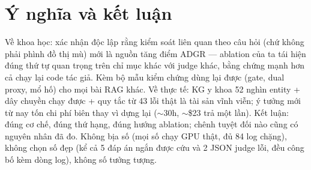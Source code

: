 \documentclass[12pt,a4paper]{article}
\begin{document}
\section{Ý nghĩa và kết luận}
Về khoa học: xác nhận độc lập rằng kiểm soát liên quan theo câu hỏi (chứ không
phải phình đồ thị mù) mới là nguồn tăng điểm ADGR --- ablation của ta tái hiện
đúng thứ tự quan trọng trên chỉ mục khác với judge khác, bằng chứng mạnh hơn
cả chạy lại code tác giả. Kèm bộ mẫu kiểm chứng dùng lại được (gate, dual
proxy, mổ hố) cho mọi bài RAG khác. Về thực tế: KG y khoa 52 nghìn entity +
dây chuyền chạy được + quy tắc từ 43 lỗi thật là tài sản vĩnh viễn; ý tưởng
mới từ nay tốn chi phí biên thay vì dựng lại ($\sim$30h, $\sim$\$23 trả một
lần). Kết luận: đúng cơ chế, đúng thứ hạng, đúng hướng ablation; chênh tuyệt
đối nào cũng có nguyên nhân đã đo. Không bịa số (mọi số chạy GPU thật, đủ 84
log chặng), không chọn số đẹp (kể cả 5 đáp án ngắn được cứu và 2 JSON judge lỗi,
đều công bố kèm dòng log), không số tưởng tượng.
\end{document}
